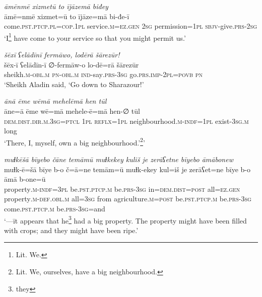 \ea \label{PM.15}
\textit{āmēnmē xizmetū to ījāzemā biđey} \\ 
\gll āmē=nmē xizmet=ū to ījāze=mā bi-đe-ī \\ 
 come\textsc{.pst}\textsc{.ptcp}\textsc{.pl}\textsc{=cop}\textsc{.1pl} service\textsc{.m}\textsc{\textsc{=ez.gen}} \textsc{2sg} permission\textsc{=1pl} \textsc{sbjv-}give\textsc{.prs}-\textsc{2sg} \\ 
\glt `I\footnote{Lit. We.} have come to your service so that you might permit us.'
\z 
 
\ea \label{PM.16}
\textit{šēxī ʕelādīnī fermāwo, lodērā šārezūr!} \\ 
\gll šēx-ī ʕelādīn-ī ∅-fermāw-o lo-dē=rā šārezūr \\ 
 sheikh\textsc{.m}\textsc{-obl}\textsc{.m} \textsc{pn}\textsc{-obl}\textsc{.m} \textsc{ind-}say\textsc{.prs}\textsc{-3sg} go\textsc{.prs}.\textsc{imp-}\textsc{2pl}\textsc{=\textsc{povb}} \textsc{pn} \\ 
\glt `Sheikh Aladin said, ‘Go down to Sharazour!'
\z 
 
\ea \label{PM.17}
\textit{ānā ēme wēmā mehelēmā hen tūl} \\ 
\gll āne=ā ēme wē=mā mehele-ē=mā hen-∅ tūl \\ 
 \textsc{dem.dist}\textsc{.dir}\textsc{.m}\textsc{.3sg}=\textsc{ptcl} \textsc{1pl} \textsc{reflx}\textsc{=1pl} neighbourhood\textsc{.m}\textsc{-indf}\textsc{=1pl} exist\textsc{-3sg}\textsc{.m} long \\ 
\glt `There, I, myself, own a big neighbourhood.’\footnote{Lit. We, ourselves, have a big neighbourhood.}'
\z 
 
\ea \label{PM.18}
\textit{muɫkēšā bīyebo čāne temāmū muɫkekey kuliš je zerāʕetne bīyebo āmābonew} \\ 
\gll muɫk-ē=šā bīye b-o č=ā=ne temām=ū muɫk-ekey kul=iš je zerāʕet=ne bīye b-o āmā b-one=ū \\ 
 property\textsc{.m}\textsc{-indf}\textsc{=3pl} be\textsc{.pst}\textsc{.ptcp}\textsc{.m} be\textsc{.prs}\textsc{-3sg} in=\textsc{dem.dist}\textsc{=\textsc{post}} all\textsc{\textsc{=ez.gen}} property\textsc{.m}\textsc{-def}\textsc{.obl}\textsc{.m} all\textsc{=3sg} from agriculture\textsc{.m}\textsc{=\textsc{post}} be\textsc{.pst}\textsc{.ptcp}\textsc{.m} be\textsc{.prs}\textsc{-3sg} come\textsc{.pst}\textsc{.ptcp}\textsc{.m} be\textsc{.prs}\textsc{-3sg}=and \\ 
\glt `—īt appears that he\footnote{they} had a big property. The property might have been filled with crops; and they might have been ripe.'
\z 
 
